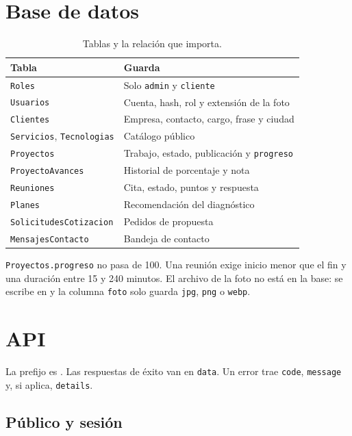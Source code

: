 \section{Base de datos}

\begin{table}[H]
  \centering
  \caption{Tablas y la relación que importa.}
  \label{tab:tablas}
  \small
  \begin{tabularx}{\textwidth}{@{}l Y@{}}
    \toprule
    Tabla & Guarda \\
    \midrule
    \texttt{Roles} & Solo \texttt{admin} y \texttt{cliente} \\
    \texttt{Usuarios} & Cuenta, hash, rol y extensión de la foto \\
    \texttt{Clientes} & Empresa, contacto, cargo, frase y ciudad \\
    \texttt{Servicios}, \texttt{Tecnologias} & Catálogo público \\
    \texttt{Proyectos} & Trabajo, estado, publicación y \texttt{progreso} \\
    \texttt{ProyectoAvances} & Historial de porcentaje y nota \\
    \texttt{Reuniones} & Cita, estado, puntos y respuesta \\
    \texttt{Planes} & Recomendación del diagnóstico \\
    \texttt{SolicitudesCotizacion} & Pedidos de propuesta \\
    \texttt{MensajesContacto} & Bandeja de contacto \\
    \bottomrule
  \end{tabularx}
\end{table}

\texttt{Proyectos.progreso} no pasa de 100. Una reunión exige inicio menor que
el fin y una duración entre 15 y 240 minutos. El archivo de la foto no está en
la base: se escribe en  y la columna
\texttt{foto} solo guarda \texttt{jpg}, \texttt{png} o \texttt{webp}.

\section{API}

La prefijo es . Las respuestas de éxito van en \texttt{data}.
Un error trae \texttt{code}, \texttt{message} y, si aplica, \texttt{details}.

\subsection{Público y sesión}

